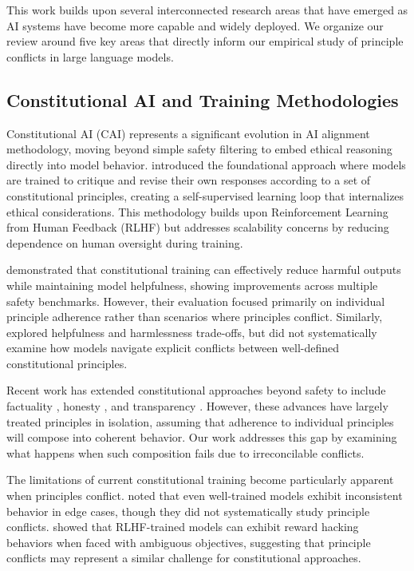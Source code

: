 \documentclass[11pt,a4paper]{article}
\begin{document}
This work builds upon several interconnected research areas that have emerged as AI systems have become more capable and widely deployed. We organize our review around five key areas that directly inform our empirical study of principle conflicts in large language models.

\subsection{Constitutional AI and Training Methodologies}

Constitutional AI (CAI) represents a significant evolution in AI alignment methodology, moving beyond simple safety filtering to embed ethical reasoning directly into model behavior. \citet{anthropic2022constitutional} introduced the foundational approach where models are trained to critique and revise their own responses according to a set of constitutional principles, creating a self-supervised learning loop that internalizes ethical considerations. This methodology builds upon Reinforcement Learning from Human Feedback (RLHF) \citep{christiano2017deep, stiennon2020learning} but addresses scalability concerns by reducing dependence on human oversight during training.

\citet{bai2022constitutional} demonstrated that constitutional training can effectively reduce harmful outputs while maintaining model helpfulness, showing improvements across multiple safety benchmarks. However, their evaluation focused primarily on individual principle adherence rather than scenarios where principles conflict. Similarly, \citet{askell2021general} explored helpfulness and harmlessness trade-offs, but did not systematically examine how models navigate explicit conflicts between well-defined constitutional principles.

Recent work has extended constitutional approaches beyond safety to include factuality \citep{menick2022teaching}, honesty \citep{evans2021truthful}, and transparency \citep{christiano2021eliciting}. However, these advances have largely treated principles in isolation, assuming that adherence to individual principles will compose into coherent behavior. Our work addresses this gap by examining what happens when such composition fails due to irreconcilable conflicts.

The limitations of current constitutional training become particularly apparent when principles conflict. \citet{ganguli2022red} noted that even well-trained models exhibit inconsistent behavior in edge cases, though they did not systematically study principle conflicts. \citet{ouyang2022training} showed that RLHF-trained models can exhibit reward hacking behaviors when faced with ambiguous objectives, suggesting that principle conflicts may represent a similar challenge for constitutional approaches.
\end{document}

